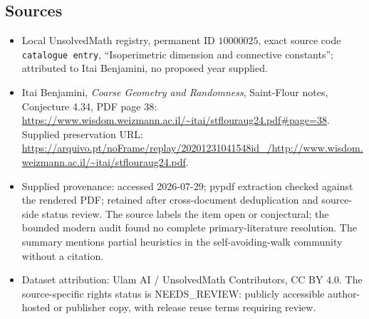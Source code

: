 \documentclass[11pt]{article}
\begin{document}
\subsection{Sources}
\begin{itemize}
\item Local UnsolvedMath registry, permanent ID \(10000025\), exact source code \texttt{catalogue entry}, ``Isoperimetric dimension and connective constants''; attributed to Itai Benjamini, no proposed year supplied.
\item Itai Benjamini, \emph{Coarse Geometry and Randomness}, Saint-Flour notes, Conjecture 4.34, PDF page 38: \url{https://www.wisdom.weizmann.ac.il/~itai/stflouraug24.pdf#page=38}. Supplied preservation URL: \url{https://arquivo.pt/noFrame/replay/20201231041548id_/http://www.wisdom.weizmann.ac.il/~itai/stflouraug24.pdf}.
\item Supplied provenance: accessed 2026-07-29; pypdf extraction checked against the rendered PDF; retained after cross-document deduplication and source-side status review. The source labels the item open or conjectural; the bounded modern audit found no complete primary-literature resolution. The summary mentions partial heuristics in the self-avoiding-walk community without a citation.
\item Dataset attribution: Ulam AI / UnsolvedMath Contributors, CC BY 4.0. The source-specific rights status is NEEDS\_REVIEW: publicly accessible author-hosted or publisher copy, with release reuse terms requiring review.
\end{itemize}
\end{document}
